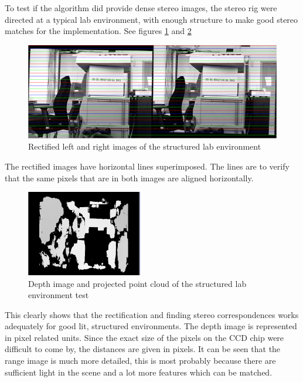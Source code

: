 To test if the algorithm did provide dense stereo images, the stereo rig were directed at
a typical lab environment, with enough structure to make good stereo matches for the
implementation. See figures \ref{chap8:fig-structured-test-rectified} and
\ref{chap8:fig-structured-test-depth}
\begin{figure}[htbp]
    \centering
    \includegraphics[width=\textwidth]{pics/structure-test-rectified}
    \caption{Rectified left and right images of the structured lab environment}
    \label{chap8:fig-structured-test-rectified}
\end{figure}
The rectified images have horizontal lines superimposed. The lines are to verify that the same
pixels that are in both images are aligned horizontally.
\begin{figure}[htbp]
    \centering
    \includegraphics[width=0.45\textwidth]{pics/structure-test-depth}
    \caption{Depth image and projected point cloud of the structured lab environment test}
    \label{chap8:fig-structured-test-depth}
\end{figure}
This clearly shows that the rectification and finding stereo correspondences
works adequately for good lit, structured
environments. The depth image is represented in pixel related units. Since the exact size
of the pixels on the CCD chip were difficult to come by, the distances are given in
pixels. It can be seen that the range image is much more detailed, this is most probably
because there are sufficient light in the scene and a lot more features which can be
matched.

